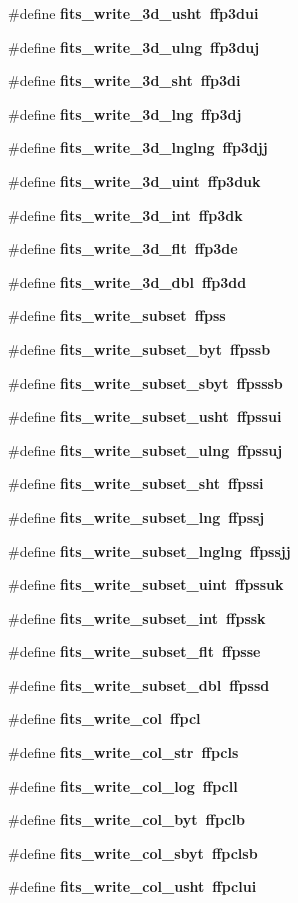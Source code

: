 \begin{CompactItemize}
\item 
\#define \bf{fits\_\-write\_\-3d\_\-usht}~ffp3dui
\item 
\#define \bf{fits\_\-write\_\-3d\_\-ulng}~ffp3duj
\item 
\#define \bf{fits\_\-write\_\-3d\_\-sht}~ffp3di
\item 
\#define \bf{fits\_\-write\_\-3d\_\-lng}~ffp3dj
\item 
\#define \bf{fits\_\-write\_\-3d\_\-lnglng}~ffp3djj
\item 
\#define \bf{fits\_\-write\_\-3d\_\-uint}~ffp3duk
\item 
\#define \bf{fits\_\-write\_\-3d\_\-int}~ffp3dk
\item 
\#define \bf{fits\_\-write\_\-3d\_\-flt}~ffp3de
\item 
\#define \bf{fits\_\-write\_\-3d\_\-dbl}~ffp3dd
\item 
\#define \bf{fits\_\-write\_\-subset}~ffpss
\item 
\#define \bf{fits\_\-write\_\-subset\_\-byt}~ffpssb
\item 
\#define \bf{fits\_\-write\_\-subset\_\-sbyt}~ffpsssb
\item 
\#define \bf{fits\_\-write\_\-subset\_\-usht}~ffpssui
\item 
\#define \bf{fits\_\-write\_\-subset\_\-ulng}~ffpssuj
\item 
\#define \bf{fits\_\-write\_\-subset\_\-sht}~ffpssi
\item 
\#define \bf{fits\_\-write\_\-subset\_\-lng}~ffpssj
\item 
\#define \bf{fits\_\-write\_\-subset\_\-lnglng}~ffpssjj
\item 
\#define \bf{fits\_\-write\_\-subset\_\-uint}~ffpssuk
\item 
\#define \bf{fits\_\-write\_\-subset\_\-int}~ffpssk
\item 
\#define \bf{fits\_\-write\_\-subset\_\-flt}~ffpsse
\item 
\#define \bf{fits\_\-write\_\-subset\_\-dbl}~ffpssd
\item 
\#define \bf{fits\_\-write\_\-col}~ffpcl
\item 
\#define \bf{fits\_\-write\_\-col\_\-str}~ffpcls
\item 
\#define \bf{fits\_\-write\_\-col\_\-log}~ffpcll
\item 
\#define \bf{fits\_\-write\_\-col\_\-byt}~ffpclb
\item 
\#define \bf{fits\_\-write\_\-col\_\-sbyt}~ffpclsb
\item 
\#define \bf{fits\_\-write\_\-col\_\-usht}~ffpclui

\end{CompactItemize}
